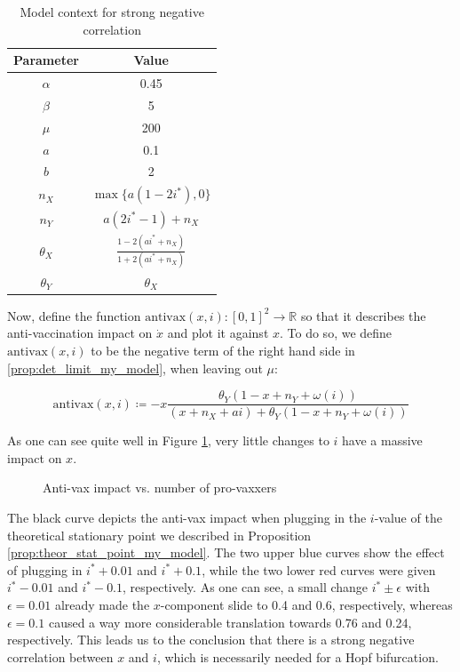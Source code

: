 \documentclass[12pt,a4paper,twoside]{article}
\begin{document}
\begin{table}[h!]
	\centering
	\begin{tabular}{c|c}
		Parameter & Value \\
		\hline
		$\alpha$&0.45\\
		$\beta$&5\\
		$\mu$&200\\
		$a$&0.1\\
		$b$&2\\
		$n_X$&$\max \lbrace a\left(1-2i^*\right), 0\rbrace$\\
		$n_Y$&$a\left(2i^* - 1\right) + n_X$\\
		$\theta_X$&$\frac{1-2\left(ai^* + n_X\right)}{1+2\left(ai^* + n_X\right)}$\\
		$\theta_Y$& $\theta_X$\\
	\end{tabular}
	\caption{Model context for strong negative correlation}
	\label{table:alu_vs_x_params}
\end{table}

Now, define the function $\mathrm{antivax}\left(x,i\right): \left[0,1\right]^2 \rightarrow \mathbb{R}$ so that it describes the anti-vaccination impact on $\dot{x}$ and plot it against $x$. To do so, we define $\mathrm{antivax}\left(x,i\right)$ to be the negative term of the right hand side in \eqref{prop:det_limit_my_model}, when leaving out $\mu$:

\begin{equation*}
\mathrm{antivax}\left(x,i\right) \coloneqq -x\frac{\theta_Y(1-x+n_Y+\omega\left(i\right))}{(x+n_X+ai) + \theta_Y(1-x+n_Y+\omega\left(i\right))}
\end{equation*}

 As one can see quite well in Figure \ref{fig:alu_vs_x}, very little changes to $i$ have a massive impact on $x$.

\begin{figure}[h!]
	\centering
	\caption{Anti-vax impact vs. number of pro-vaxxers}
	\label{fig:alu_vs_x}
	\def\svgwidth{350pt}
	
\end{figure}

The black curve depicts the anti-vax impact when plugging in the $i$-value of the theoretical stationary point we described in Proposition \ref{prop:theor_stat_point_my_model}. The two upper blue curves show the effect of plugging in $i^* + 0.01$ and $i^* + 0.1$, while the two lower red curves were given $i^* - 0.01$ and $i^* - 0.1$, respectively. As one can see, a small change $i^* \pm \epsilon$ with $\epsilon = 0.01$ already made the $x$-component slide to 0.4 and 0.6, respectively, whereas $\epsilon = 0.1$ caused a way more considerable translation towards
0.76 and 0.24, respectively. This leads us to the conclusion that there is a strong negative correlation between $x$ and $i$, which is necessarily needed for a Hopf bifurcation.
\end{document}
